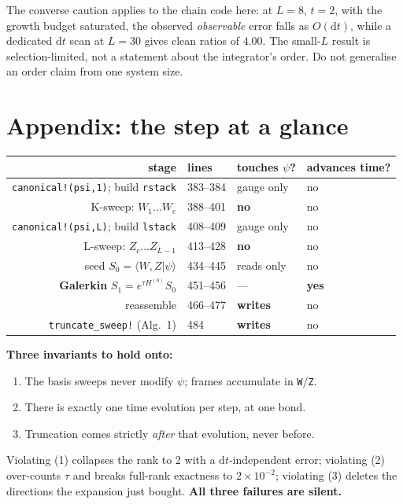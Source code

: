 \documentclass[11pt,a4paper]{article}
\newcommand{\code}[1]{\texttt{\small #1}}
\newcommand{\dd}{\mathrm{d}}
\begin{document}
The converse caution applies to the chain code here: at $L=8$, $t=2$, with the growth budget
saturated, the observed \emph{observable} error falls as $O(\dd t)$, while a dedicated $\dd t$
scan at $L=30$ gives clean ratios of $4.00$. The small-$L$ result is selection-limited, not a
statement about the integrator's order. Do not generalise an order claim from one system size.

\part*{Appendix: the step at a glance}

\begin{center}
\small
\begin{tabular}{@{}rlll@{}}
\toprule
\textbf{stage} & \textbf{lines} & \textbf{touches $\psi$?} & \textbf{advances time?} \\
\midrule
\code{canonical!(psi,1)}; build \code{rstack} & 383--384 & gauge only & no \\
K-sweep: $W_1\dots W_c$ & 388--401 & \textbf{no} & no \\
\code{canonical!(psi,L)}; build \code{lstack} & 408--409 & gauge only & no \\
L-sweep: $Z_c\dots Z_{L-1}$ & 413--428 & \textbf{no} & no \\
seed $S_0=\langle W,Z|\psi\rangle$ & 434--445 & reads only & no \\
\textbf{Galerkin} $S_1=e^{\tau H^{(0)}}S_0$ & 451--456 & --- & \textbf{yes} \\
reassemble & 466--477 & \textbf{writes} & no \\
\code{truncate\_sweep!} (Alg.\ 1) & 484 & \textbf{writes} & no \\
\bottomrule
\end{tabular}
\end{center}

\vspace{0.6em}
\noindent
\textbf{Three invariants to hold onto:}
\begin{enumerate}[nosep,leftmargin=1.6em]
  \item The basis sweeps never modify $\psi$; frames accumulate in \code{W}/\code{Z}.
  \item There is exactly one time evolution per step, at one bond.
  \item Truncation comes strictly \emph{after} that evolution, never before.
\end{enumerate}

\noindent
Violating (1) collapses the rank to 2 with a $\dd t$-independent error; violating (2)
over-counts $\tau$ and breaks full-rank exactness to $2\times10^{-2}$; violating (3) deletes the
directions the expansion just bought. \textbf{All three failures are silent.}
\end{document}
